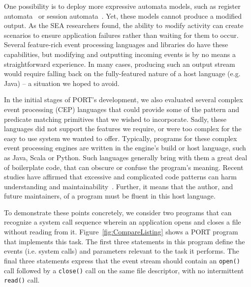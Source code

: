 One possibility is to deploy more expressive automata models, such as register automata~\cite{DBLP:journals/tcs/KaminskiF94} or session automata~\cite{DBLP:journals/corr/BolligHLM14}. Yet, these models cannot produce a modified output.  As the 
SEA researchers found,  the ability to
{\textit modify} activity can create scenarios to ensure
application failures rather than  waiting for them to occur.
Several feature-rich event processing
languages and libraries do have these capabilities, but
modifying and outputting
incoming events
is by no means a straightforward experience.
In many cases, producing such an output stream  would require
falling back on the fully-featured nature of a host language (e.g. Java) -- a situation
we hoped to avoid.

In the initial stages of PORT's development, we also
evaluated several
complex event processing (CEP) languages that
could
provide some of the pattern and predicate matching primitives
that we wished to
incorporate.
Sadly,
these languages did not
support  the features
we require,
or were too complex
for the easy to use  system we wanted to offer.
Typically,
programs for these complex event processing engines are
written in the engine's build or host language,
such as Java,
Scala or
Python.
Such languages generally bring with them a great deal of boilerplate code,
that can obscure or confuse
the program's meaning.
Recent studies
have affirmed that excessive and complicated code
patterns can harm
understanding and
maintainability~\cite{misunderstandings}.
Further,
it means that the author,
and future maintainers,
of a
program must be fluent in this host language.


To demonstrate these points concretely,
we consider two programs that can recognize a system call sequence wherein an
application opens and closes a file
without reading from it.
Figure~\ref{fig:CompareListing} shows a PORT program that implements this
task.  The first three statements in this program define the events (i.e.
system calls) and parameters relevant to the task it performs.  The final three statements express that the event stream
should contain an \texttt{open()} call followed by a \texttt{close()} call on the same file descriptor, with no intermittent \texttt{read()} call.


